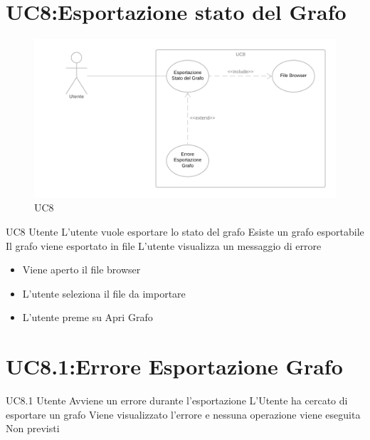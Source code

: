\documentclass[../AnalisideiRequisiti.tex]{subfiles}
\begin{document}
\section{UC8:Esportazione stato del Grafo}
\begin{figure}[H]
	\caption{UC8}
	\centering
	\includegraphics[width=\textwidth]{../img/UC08.png}
\end{figure}
\UserCase
{UC8}
{Utente}
{}
{L'utente vuole esportare lo stato del grafo}
{Esiste un grafo esportabile}
{Il grafo viene esportato in file}
{ L'utente visualizza un messaggio di errore }
{
	{\begin{itemize}
			\item{} Viene aperto il file browser
			\item{} L'utente seleziona il file da importare
			\item{} L'utente preme su Apri Grafo
\end{itemize}}}

\section{UC8.1:Errore Esportazione Grafo}
\UserCase
{UC8.1}
{Utente}
{}
{Avviene un errore durante l'esportazione}
{L'Utente ha cercato di esportare un grafo}
{Viene visualizzato l'errore e nessuna operazione viene eseguita}
{Non previsti}
{}
\end{document}
